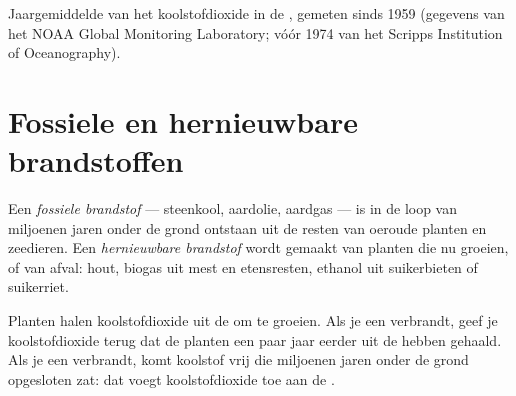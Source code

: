 \begin{omfigure}

{\small Jaargemiddelde van het koolstofdioxide in de , gemeten sinds
1959 (gegevens van het NOAA Global Monitoring Laboratory; vóór 1974 van
het Scripps Institution of Oceanography).}
\end{omfigure}

\section{Fossiele en hernieuwbare brandstoffen}

\begin{definition}\label{def:g8:combustion-and-fuels:fossil}
Een \emph{fossiele brandstof} --- steenkool,
aardolie, aardgas --- is in de loop van miljoenen jaren onder de grond
ontstaan uit de resten van oeroude planten en zeedieren. Een
\emph{hernieuwbare brandstof} wordt
gemaakt van planten die nu groeien, of van afval: hout, biogas uit mest
en etensresten, ethanol uit suikerbieten of suikerriet.
\end{definition}

\begin{proposition}\label{prop:g8:combustion-and-fuels:cycle}
Planten halen koolstofdioxide uit de  om te groeien. Als je een
 verbrandt, geef je koolstofdioxide terug dat de
planten een paar jaar eerder uit de  hebben gehaald. Als je een
 verbrandt, komt koolstof vrij die miljoenen jaren
onder de grond opgesloten zat: dat voegt koolstofdioxide toe aan de
.
\end{proposition}

